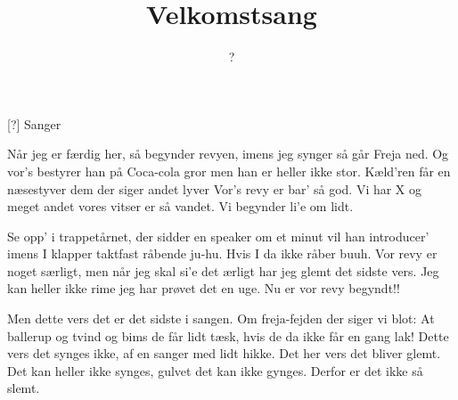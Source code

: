 \documentclass[a4paper,11pt]{article}
\title{Velkomstsang}
\author{?}
\begin{document}
\maketitle

\begin{roles}
[?] Sanger
\end{roles}


\begin{song}
%
Når jeg er færdig her, så begynder revyen,
imens jeg synger så går Freja ned.
Og vor's bestyrer han på Coca-cola gror
men han er heller ikke stor.
Kæld'ren får en næsestyver
dem der siger andet lyver
Vor's revy er bar' så god.
Vi har X og meget andet
vores vitser er så vandet.
Vi begynder li'e om lidt.

Se opp' i trappetårnet, der sidder en speaker
om et minut vil han introducer'
imens I klapper taktfast råbende ju-hu.
Hvis I da ikke råber buuh.
Vor revy er noget særligt,
men når jeg skal si'e det ærligt
har jeg glemt det sidste vers.
Jeg kan heller ikke rime
jeg har prøvet det en uge.
Nu er vor revy begyndt!!

Men dette vers det er det sidste i sangen.
Om freja-fejden der siger vi blot:
At ballerup og tvind og bims de får lidt tæsk,
hvis de da ikke får en gang lak!
Dette vers det synges ikke,
af en sanger med lidt hikke.
Det her vers det bliver glemt.
Det kan heller ikke synges,
gulvet det kan ikke gynges.
Derfor er det ikke så slemt.
\end{song}
\end{document}
